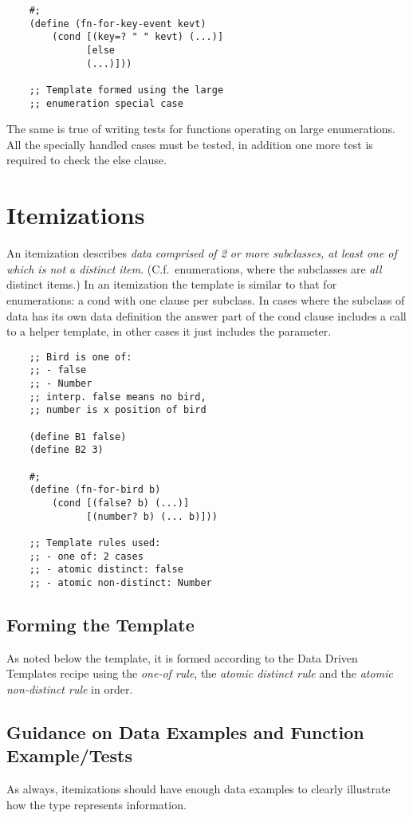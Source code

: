 \documentclass[11pt,a4paper]{report}
\begin{document}
	\begin{verbatim}
	#;
	(define (fn-for-key-event kevt)
		(cond [(key=? " " kevt) (...)]
		      [else
			  (...)]))
			  
	;; Template formed using the large
	;; enumeration special case
	\end{verbatim}
	
	The same is true of writing tests for functions operating on large enumerations. All the specially
	handled cases must be tested, in addition one more test is required to check the else clause.
	\pagebreak
	\section{Itemizations} \label{sec:itemizations}
	An itemization describes \emph{data comprised of 2 or more subclasses, at least one of which is not a
	distinct item}. (C.f.\ enumerations, where the subclasses are \emph{all} distinct items.) In an itemization
	the template is similar to that for enumerations: a cond with one clause per subclass. In cases
	where the subclass of data has its own data definition the answer part of the cond clause
	includes a call to a helper template, in other cases it just includes the parameter.
	
	\begin{verbatim}
	;; Bird is one of:
	;; - false
	;; - Number
	;; interp. false means no bird,
	;; number is x position of bird
	
	(define B1 false)
	(define B2 3)
	
	#;
	(define (fn-for-bird b)
		(cond [(false? b) (...)]
		      [(number? b) (... b)]))
		      
	;; Template rules used:
	;; - one of: 2 cases
	;; - atomic distinct: false
	;; - atomic non-distinct: Number
	\end{verbatim}
	
	\subsection*{Forming the Template}
	As noted below the template, it is formed according to the Data Driven Templates recipe using the
	\emph{one-of rule}, the \emph{atomic distinct rule} and the \emph{atomic non-distinct rule} in order.
	
	\subsection*{Guidance on Data Examples and Function Example/Tests}
	As always, itemizations should have enough data examples to clearly illustrate how the type
	represents information.
	
\end{document}
